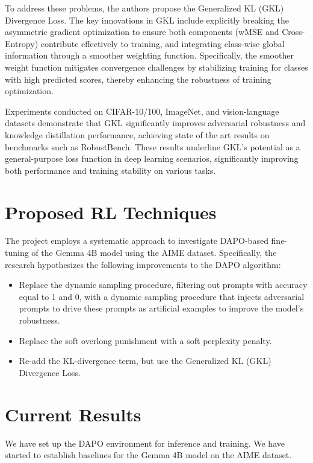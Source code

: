 \documentclass[11pt, oneside]{article}   	%
\begin{document}
To address these problems, the authors propose the Generalized KL (GKL) Divergence Loss. The key innovations in GKL include explicitly breaking the asymmetric gradient optimization to ensure both components (wMSE and Cross-Entropy) contribute effectively to training, and integrating class-wise global information through a smoother weighting function. Specifically, the smoother weight function mitigates convergence challenges by stabilizing training for classes with high predicted scores, thereby enhancing the robustness of training optimization.

Experiments conducted on CIFAR-10/100, ImageNet, and vision-language datasets demonstrate that GKL significantly improves adversarial robustness and knowledge distillation performance, achieving state of the art results on benchmarks such as RobustBench. These results underline GKL’s potential as a general-purpose loss function in deep learning scenarios, significantly improving both performance and training stability on various tasks.


\section*{Proposed RL Techniques}

The project employs a systematic approach to investigate DAPO-based fine-tuning of the Gemma 4B model using the AIME dataset. Specifically, the research hypothesizes the following improvements to the DAPO algorithm:

\begin{itemize}
	\item Replace the dynamic sampling procedure, filtering out prompts with accuracy equal to 1 and 0, with a dynamic sampling procedure that injects adversarial prompts to drive these prompts as artificial examples to improve the model's robustness.
	\item Replace the soft overlong punishment with a soft perplexity penalty.
	\item Re-add the KL-divergence term, but use the Generalized KL (GKL) Divergence Loss.
\end{itemize}

\section*{Current Results}
We have set up the DAPO environment for inference and training. We have started to establish baselines for the Gemma 4B model on the AIME dataset.
\end{document}
